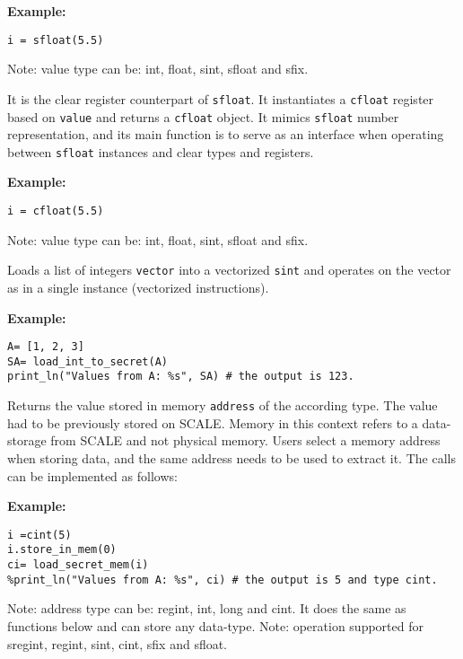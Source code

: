 \noindent
\textbf{Example:}
\begin{lstlisting}
i = sfloat(5.5)
\end{lstlisting}
\begin{footnotesize}
Note: value type can be: int, float, sint, sfloat and sfix.
\end{footnotesize}

It is the clear register counterpart of \verb|sfloat|.
It instantiates a \verb|cfloat| register based on \verb|value| and returns a \verb|cfloat| object. 
It mimics \verb|sfloat| number representation, 
and its main function is to serve as an interface when operating 
between \verb|sfloat| instances and clear types and registers.

\noindent
\textbf{Example:}
\begin{lstlisting}
i = cfloat(5.5)
\end{lstlisting}
\begin{footnotesize}
Note: value type can be: int, float, sint, sfloat and sfix.
\end{footnotesize}

Loads a list of integers \verb|vector| into a vectorized \verb|sint| and operates on the vector as in a single instance (vectorized instructions).

\noindent
\textbf{Example:}
\begin{lstlisting}
A= [1, 2, 3]
SA= load_int_to_secret(A)
print_ln("Values from A: %s", SA) # the output is 123.
\end{lstlisting}

Returns the value stored in memory \verb|address| of the according type. The value had to be previously stored on SCALE. Memory in this context refers to a data-storage from SCALE and not physical memory. Users select a memory address when storing data, and the same address needs to be used to extract it. The calls can be implemented as follows: 

\noindent
\textbf{Example:}
\begin{lstlisting}
i =cint(5)
i.store_in_mem(0)
ci= load_secret_mem(i)
%print_ln("Values from A: %s", ci) # the output is 5 and type cint.
\end{lstlisting}
\begin{footnotesize}
Note: address type can be: regint, int, long and cint. It does the same as functions below and can store any data-type.
Note: operation supported for sregint, regint, sint, cint, sfix and sfloat.
\end{footnotesize}

